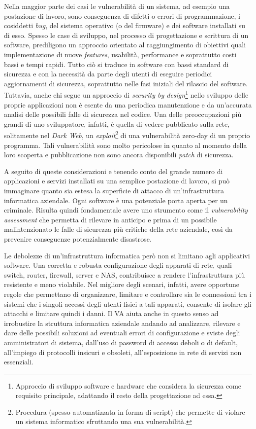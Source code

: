 \documentclass[target=mst,aauheader=]{thud}
\begin{document}
Nella maggior parte dei casi le vulnerabilità di un sistema, ad esempio una postazione di lavoro, sono conseguenza di difetti o errori di programmazione, i cosiddetti \textit{bug}, del sistema operativo (o del firmware) e dei software installati su di esso. Spesso le case di sviluppo, nel processo di progettazione e scrittura di un software, prediligono un approccio orientato al raggiungimento di obiettivi quali implementazione di nuove \textit{features}, usabilità, performance e soprattutto costi bassi e tempi rapidi. Tutto ciò si traduce in software con bassi standard di sicurezza e con la necessità da parte degli utenti di eseguire periodici aggiornamenti di sicurezza, soprattutto nelle fasi iniziali del rilascio del software. Tuttavia, anche chi segue un approccio di \textit{security by design}\footnote{Approccio di sviluppo software e hardware che considera la sicurezza come requisito principale, adattando il resto della progettazione ad essa.} nello sviluppo delle proprie applicazioni non è esente da una periodica manutenzione e da un’accurata analisi delle possibili falle di sicurezza nel codice. Una delle preoccupazioni più grandi di uno sviluppatore, infatti, è quella di vedere pubblicato sulla rete, solitamente nel \textit{Dark Web}, un \textit{exploit}\footnote{Procedura (spesso automatizzata in forma di script) che permette di violare un sistema informatico sfruttando una sua vulnerabilità.} di una vulnerabilità zero-day di un proprio programma. Tali vulnerabilità sono molto pericolose in quanto al momento della loro scoperta e pubblicazione non sono ancora disponibili \textit{patch} di sicurezza.

A seguito di queste considerazioni e tenendo conto del grande numero di applicazioni e servizi installati su una semplice postazione di lavoro, si può immaginare quanto sia estesa la superficie di attacco di un’infrastruttura informatica aziendale. Ogni software è una potenziale porta aperta per un criminale. Risulta quindi fondamentale avere uno strumento come il \textit{vulnerability assessment} che permetta di rilevare in anticipo e prima di un possibile malintenzionato le falle di sicurezza più critiche della rete aziendale, così da prevenire conseguenze potenzialmente disastrose.

Le debolezze di un’infrastruttura informatica però non si limitano agli applicativi software. Una corretta e robusta configurazione degli apparati di rete, quali switch, router, firewall, server e NAS, contribuisce a rendere l’infrastruttura più resistente e meno violabile. Nel migliore degli scenari, infatti, avere opportune regole che permettano di organizzare, limitare e controllare sia le connessioni tra i sistemi che i singoli accessi degli utenti fisici a tali apparati, consente di isolare gli attacchi e limitare quindi i danni. Il VA aiuta anche in questo senso ad irrobustire la struttura informatica aziendale andando ad analizzare, rilevare e dare delle possibili soluzioni ad eventuali errori di configurazione e sviste degli amministratori di sistema, dall’uso di password di accesso deboli o di default, all’impiego di protocolli insicuri e obsoleti, all’esposizione in rete di servizi non essenziali.
\end{document}

